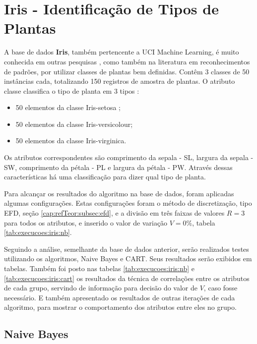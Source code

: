 \section{Iris - Identificação de Tipos de Plantas}


A base de dados \textbf{Iris}, também pertencente a UCI Machine Learning, é muito conhecida em outras pesquisas , como também na literatura em reconhecimentos de padrões, por utilizar classes de plantas bem definidas. Contêm 3 classes de 50 instâncias cada, totalizando  150 registros de amostra de plantas. O atributo classe classifica o tipo de planta em 3 tipos \cite{FISHER1936}:

\begin{itemize}[noitemsep]
 \item 50 elementos da classe Iris-setosa ;
 \item 50 elementos da classe Iris-versicolour;
 \item 50 elementos da classe Iris-virginica.
\end{itemize}

Os atributos correspondentes são comprimento da sepala - SL, largura da sepala - SW, comprimento da pétala - PL e largura da pétala - PW. Através dessas características há uma classificação para dizer qual tipo de planta.

Para alcançar os resultados do algoritmo na base de dados, foram aplicadas algumas  configurações. Estas configurações foram o método de discretização, tipo EFD, seção \ref{cap:refTeor:subsec:efd}, e a divisão em três faixas de valores ${R = 3}$ para todos os atributos, e inserido o valor de variação ${V=0\%}$, tabela \ref{tab:execucoes:iris:nb}.

Seguindo a análise, semelhante da base de dados anterior, serão realizados testes utilizando os algoritmos, Naive Bayes e CART. Seus resultados serão exibidos em tabelas. Também foi posto nas tabelas \ref{tab:execucoes:iris:nb} e \ref{tab:execucoes:iris:cart} os resultados da técnica de correlações entre os atributos de cada grupo, servindo de informação para decisão do valor de ${V}$, caso fosse necessário. E também apresentado os resultados de outras iterações de cada algoritmo, para mostrar o comportamento dos atributos entre eles no grupo.

\subsection{Naive Bayes} \label{cap:resultados:ssec:iris:nb}

